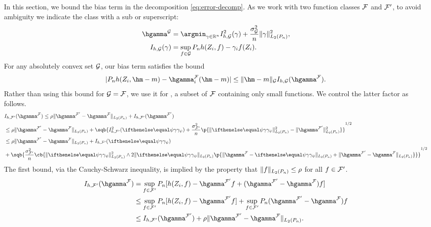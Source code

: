 In this section, we bound the bias term in the decomposition \eqref{eq:error-decomp}. 
As we work with two function classes $\mathcal{F}$ and $\mathcal{F}'$, to avoid ambiguity we indicate the class with a sub or superscript:
\begin{equation}
\label{eq:weight-def-explicit}
\begin{aligned}
 \hgamma^{\GG} &= \argmin_{\gamma \in \R^n} I_{h,\GG}^2(\gamma) + \frac{\sigma_{\GG}^2}{n}\norm{\gamma}_{L_2(\Pn)}^2, \\
 I_{h,\GG}(\gamma) &= \sup_{f \in \GG} \Pn h(Z_i, f) - \gamma_i f(Z_i).
\end{aligned}
\end{equation}
For any absolutely convex set $\mathcal{G}$, our bias term satisfies the bound
\[ \abs{\Pn h(Z_i, \hm - m) - \hgamma^{\F}_i (\hm - m)} \le \norm{\hm - m}_{\GG} I_{h,\GG}(\hgamma^{\F}). \]
Rather than using this bound for $\mathcal{G}=\mathcal{F}$, we use it for ,
a subset of $\mathcal{F}$ containing only small functions. We control the latter factor as follows.
\begin{equation}
\label{eq:bias-bound-abstract}
\begin{aligned}
&I_{h,\F'}(\hgamma^{\F}) \le \rho\norm{\hgamma^{\F'} - \hgamma^{\F}}_{L_2(\Pn)} + I_{h,\F'}(\hgamma^{\F'}) \\
&\le \rho\norm{\hgamma^{\F'} - \hgamma^{\F}}_{L_2(\Pn)} +  \sqb{I_{h,\F'}^2(\riesz[\psi]) +
\frac{\sigma_{\F'}^2}{n}\p{\norm{\riesz[\psi]}_{L_2(\Pn)}^2 - \norm{\hgamma^{\F'}}_{L_2(\Pn)}^2}}^{1/2} \\
&\le \rho\norm{\hgamma^{\F'} - \hgamma^{\F}}_{L_2(\Pn)} + I_{h,\F'}(\riesz[\psi]) \\
&+ \sqb{\frac{\sigma_{\F'}^2}{n}\cb{\norm{\riesz[\psi]}_{L_2(\Pn)}^2 \wedge 2\norm{\riesz[\psi]}_{L_2(\Pn)}\p{\norm{\hgamma^{\F}-\riesz[\psi]}_{L_2(\Pn)} + \norm{\hgamma^{\F'} - \hgamma^{\F}}_{L_2(\Pn)}}}}^{1/2}
\end{aligned}
\end{equation}
The first bound, via the Cauchy-Schwarz inequality, is implied by the property that $\norm{f}_{L_2(\Pn)} \le \rho$ for all $f \in \mathcal{F}'$.
\begin{align*} 
I_{h,\F'}(\hgamma^{\F}) 
&=   \sup_{f \in \F'} \Pn[ h(Z_i, f) - \hgamma^{\F'} f + (\hgamma^{\F'}-\hgamma^{\F})f] \\
&\le \sup_{f \in \F'} \Pn[ h(Z_i, f) - \hgamma^{\F'} f] + \sup_{f \in \F'} \Pn (\hgamma^{\F'}-\hgamma^{\F})f \\
&\le I_{h,\F'}(\hgamma^{\F'}) + \rho \norm{\hgamma^{\F'}-\hgamma^{\F}}_{L_2(\Pn)}. 
\end{align*}

